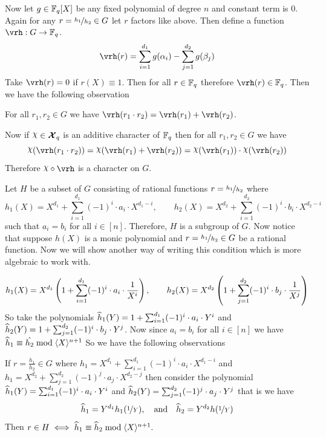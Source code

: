 Now let $g\in\mathbb{F}_q[X]$ be any fixed polynomial of degree $n$ and constant term is $0$. Again for any $r=\nicefrac{h_1}{h_2}\in G$ let $r$ factors like above. Then define a function $\vrh:G\to \bbF_q$. $$\vrh(r)=\sum_{i=1}^{d_1}g(\alpha_i)-\sum_{j=1}^{d_2}g(\beta_j)$$Take $\vrh(r)=0$ if $r(X)\equiv 1$. Then for all $r\in\mathbb{F}_q$ therefore $\vrh(r)\in\bbF_q$. Then we have the following observation
\begin{observation}
  For all $r_1,r_2\in G$ we have $\vrh(r_1\cdot r_2)=\vrh(r_1)+\vrh(r_2)$. 
\end{observation}
Now if $\chi\in\Xq$ is an additive character of $\mathbb{F}_q$ then for all $r_1,r_2\in G$ we have $$\chi(\vrh(r_1\cdot r_2))=\chi(\vrh(r_1)+\vrh(r_2))=\chi(\vrh(r_1))\cdot \chi(\vrh(r_2))$$Therefore $\chi\circ\vrh$ is a character on $G$. 

Let $H$ be a subset of $G$ consisting of rational functions $r=\nicefrac{h_1}{h_2}$ where $$h_1(X)=X^{d_1}+\sum_{i=1}^{d_1}(-1)^i\cdot a_i\cdot X^{d_1-i},\qquad h_2(X)=X^{d_2}+\sum_{i=1}^{d_2}(-1)^i\cdot b_i\cdot X^{d_2-i}$$ such that $a_i=b_i$ for all $i\in[n]$. Therefore, $H$ is a subgroup of $G$. Now notice that suppose $h(X)$ is a monic polynomial and $r=\nicefrac{h_1}{h_2}\in G$ be a rational function. Now we will show another way of writing this condition which is more algebraic to work with.

$$h_1(X) = X^{d_1}\left(1+\sum_{i=1}^{d_1}(-1)^i\cdot a_i\cdot \frac1{X^i}\right),\qquad h_2(X) = X^{d_2}\left(1+\sum_{j=1}^{d_2}(-1)^i\cdot b_j\cdot \frac1{X^j}\right)$$So take the polynomials $\widehat{h}_1(Y)=1+\sum_{i=1}^{d_1}(-1)^i\cdot a_i\cdot Y^i$ and $\widehat{h}_2(Y)=1+\sum_{j=1}^{d_2}(-1)^i\cdot b_j\cdot Y^j$. Now since $a_i=b_i$ for all $i\in[n]$ we have $\widehat{h}_1\equiv \hat{h_2}\bmod{\langle X\rangle^{n+1}}$ So we have the following observations
\begin{observation}
  If $r=\frac{h_1}{h_2}\in G$ where $h_1=X^{d_1}+\sum_{i=1}^{d_1}(-1)^i\cdot a_i\cdot X^{d_1-i}$ and $h_1=X^{d_2}+\sum_{j=1}^{d_2}(-1)^j\cdot a_j\cdot X^{d_2-j}$ then consider the polynomial $\widehat{h}_1(Y)=\sum_{i=1}^{d_1}(-1)^i\cdot a_i\cdot Y^{i}$ and $\widehat{h}_2(Y)=\sum_{j=1}^{d_2}(-1)^j\cdot a_j\cdot Y^{j}$ that is we have  $$\widehat{h}_1=Y^{d_1}h_1(\nicefrac1Y),\quad\text{and}\quad\widehat{h}_2=Y^{d_2}h(\nicefrac1Y)$$Then $r\in H\iff \widehat{h}_1\equiv \widehat{h}_2\bmod{\langle X\rangle^{n+1}}.$
\end{observation}

